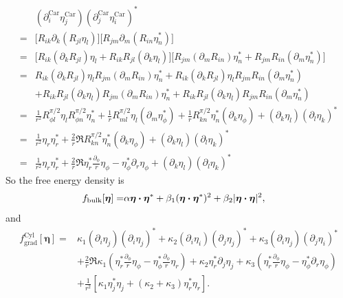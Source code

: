 \documentclass[aps,prl,preprint]{revtex4-2}
\begin{document}
\begin{align}
      & (\partial_i^{\text{Car}}\eta_j^{\text{Car}})(\partial_j^{\text{Car}}\eta_i^{\text{Car}})^*                              \\
    = & \bigg[R_{ik}\partial_k(R_{jl}\eta_l)\bigg]\bigg[R_{jm}\partial_m(R_{in}\eta_n^*)\bigg]                                  \\
    = & \bigg[R_{ik}(\partial_k R_{jl})\eta_l + R_{ik}R_{jl}(\partial_k\eta_l)\bigg]
    \bigg[R_{jm}(\partial_m R_{in})\eta_n^* + R_{jm}R_{in}(\partial_m\eta_n^*)\bigg]                                            \\
    = & R_{ik}(\partial_k R_{jl})\eta_l R_{jm}(\partial_m R_{in})\eta_n^*
    + R_{ik}(\partial_k R_{jl})\eta_l R_{jm}R_{in}(\partial_m\eta_n^*)\nonumber                                                 \\
      & + R_{ik}R_{jl}(\partial_k\eta_l) R_{jm}(\partial_m R_{in})\eta_n^*
    + R_{ik}R_{jl}(\partial_k\eta_l) R_{jm}R_{in}(\partial_m\eta_n^*)                                                           \\
    = & \frac{1}{r^2}R^{\pi/2}_{\phi l}\eta_l R^{\pi/2}_{\phi n}\eta_n^*
    +\frac{1}{r}R^{\pi/2}_{ml}\eta_l(\partial_m\eta_\phi^*)
    +\frac{1}{r}R^{\pi/2}_{kn}\eta_n^*(\partial_k\eta_\phi)
    +(\partial_k\eta_l)(\partial_l \eta_k)^*                                                                                    \\
    = & \frac{1}{r^2}\eta_r\eta_r^* + \frac{2}{r}\Re{R^{\pi/2}_{kn}\eta_n^*(\partial_k\eta_\phi)}
    + (\partial_k\eta_l)(\partial_l \eta_k)^*                                                                                   \\
    = & \frac{1}{r^2}\eta_r\eta_r^* + \frac{2}{r}\Re{\eta_r^*\frac{\partial_\phi}{r}\eta_\phi - \eta_\phi^*\partial_r\eta_\phi}
    + (\partial_k\eta_l)(\partial_l \eta_k)^*
\end{align}
So the free energy density is
\begin{align}
    f_{\text{bulk}}[\bm{\eta}]= & \alpha\bm{\eta}\vdot\bm{\eta}^*
    +\beta_1(\bm{\eta}\vdot\bm{\eta}^*)^2
    +\beta_2|\bm{\eta}\vdot\bm{\eta}|^2,
\end{align}
and
\begin{align}
    f^{\text{Cyl}}_{\text{grad}}[\bm{\eta}]= & \kappa_1(\partial_i\eta_j)(\partial_i\eta_j)^*
    +\kappa_2(\partial_i\eta_i)(\partial_j\eta_j)^*
    +\kappa_3(\partial_i\eta_j)(\partial_j\eta_i)^*\nonumber                                  \\
                                             & +\frac{2}{r}\Re{
        \kappa_1\left(\eta_r^*\frac{\partial_\phi}{r}\eta_\phi
        -\eta_\phi^*\frac{\partial_\phi}{r}\eta_r\right)
        +\kappa_2\eta_r^*\partial_j\eta_j
        +\kappa_3\left(\eta_r^*\frac{\partial_\phi}{r}\eta_\phi
    -\eta_\phi^*\partial_r\eta_\phi\right)}\nonumber                                          \\
                                             & +\frac{1}{r^2}\left[\kappa_1\eta^*_j\eta_j
        +(\kappa_2+\kappa_3)\eta_r^*\eta_r\right].\label{fgrad}
\end{align}
\end{document}
